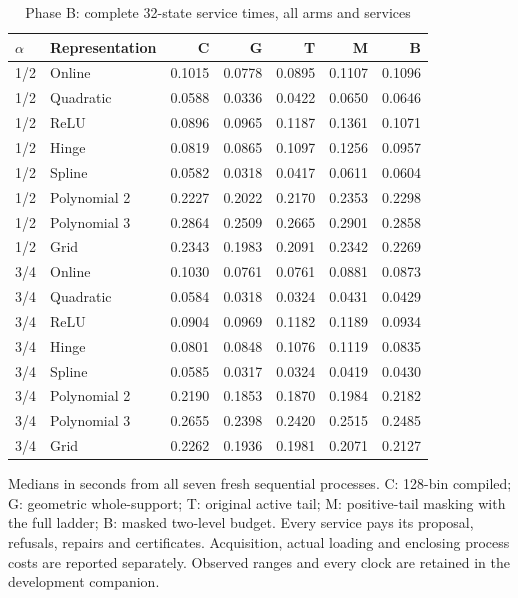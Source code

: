 \begin{table}[t]\centering\small
\caption{Phase B: complete 32-state service times, all arms and services}
\label{tab:timing119b}
\begin{tabular}{llrrrrr}\toprule
$\alpha$ & Representation & C & G & T & M & B\\\midrule
1/2 & Online & 0.1015 & 0.0778 & 0.0895 & 0.1107 & 0.1096 \\
1/2 & Quadratic & 0.0588 & 0.0336 & 0.0422 & 0.0650 & 0.0646 \\
1/2 & ReLU & 0.0896 & 0.0965 & 0.1187 & 0.1361 & 0.1071 \\
1/2 & Hinge & 0.0819 & 0.0865 & 0.1097 & 0.1256 & 0.0957 \\
1/2 & Spline & 0.0582 & 0.0318 & 0.0417 & 0.0611 & 0.0604 \\
1/2 & Polynomial 2 & 0.2227 & 0.2022 & 0.2170 & 0.2353 & 0.2298 \\
1/2 & Polynomial 3 & 0.2864 & 0.2509 & 0.2665 & 0.2901 & 0.2858 \\
1/2 & Grid & 0.2343 & 0.1983 & 0.2091 & 0.2342 & 0.2269 \\
3/4 & Online & 0.1030 & 0.0761 & 0.0761 & 0.0881 & 0.0873 \\
3/4 & Quadratic & 0.0584 & 0.0318 & 0.0324 & 0.0431 & 0.0429 \\
3/4 & ReLU & 0.0904 & 0.0969 & 0.1182 & 0.1189 & 0.0934 \\
3/4 & Hinge & 0.0801 & 0.0848 & 0.1076 & 0.1119 & 0.0835 \\
3/4 & Spline & 0.0585 & 0.0317 & 0.0324 & 0.0419 & 0.0430 \\
3/4 & Polynomial 2 & 0.2190 & 0.1853 & 0.1870 & 0.1984 & 0.2182 \\
3/4 & Polynomial 3 & 0.2655 & 0.2398 & 0.2420 & 0.2515 & 0.2485 \\
3/4 & Grid & 0.2262 & 0.1936 & 0.1981 & 0.2071 & 0.2127 \\
\bottomrule\end{tabular}
\par\smallskip\footnotesize
Medians in seconds from all seven fresh sequential processes. C: 128-bin compiled; G: geometric whole-support; T: original active tail; M: positive-tail masking with the full ladder; B: masked two-level budget. Every service pays its proposal, refusals, repairs and certificates. Acquisition, actual loading and enclosing process costs are reported separately. Observed ranges and every clock are retained in the development companion.
\end{table}
